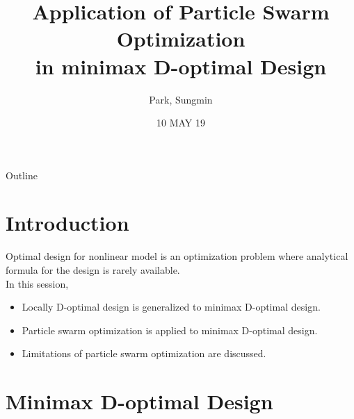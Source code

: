 \documentclass{beamer}
\title{Application of Particle Swarm Optimization\\ in minimax D-optimal Design}
\author{Park, Sungmin}
\institute[SNU] %
{
  Department of Statistics\\
  Seoul National University
}
\date{10 MAY 19}
\begin{document}
\begin{frame}
  \titlepage
\end{frame}

\begin{frame}{Outline}
  \tableofcontents
\end{frame}


\section{Introduction}
\begin{frame}
  Optimal design for nonlinear model is an optimization problem where analytical formula for the design is rarely available.\\
  \vspace{3mm}
  In this session,
  \vspace{3mm}
  \begin{itemize}
    \item Locally D-optimal design is generalized to minimax D-optimal design.
    \vspace{3mm}
    \item Particle swarm optimization is applied to minimax D-optimal design.
    \vspace{3mm}
    \item Limitations of particle swarm optimization are discussed.
  \end{itemize}
\end{frame}

\section{Minimax D-optimal Design}

\end{document}
